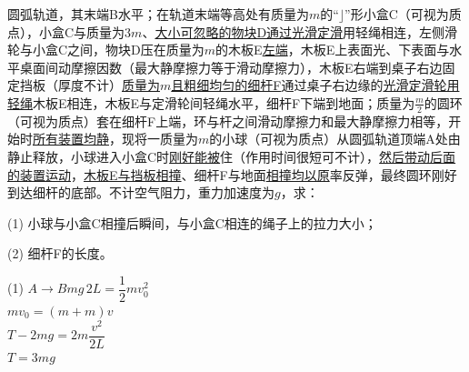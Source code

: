 \begin{problem}
圆弧轨道，其末端B水平；在轨道末端等高处有质量为$m$的“$\rfloor$”形小盒C（可视为质点），小盒C与质量为$3m$、\underline{大小可忽略的物块D通过光滑定滑}用轻绳相连，左侧滑轮与小盒C之间，物块D压在质量为\underline{$m$}的木板E\underline{左端}，木板E上表面光、下表面与水平桌面间动摩擦因数（最大静摩擦力等于滑动摩擦力），木板E右端到桌子右边固定挡板（厚度不计）\underline{质量为$m$且粗细均匀的细杆F}通过桌子右边缘的\underline{光滑定滑轮用轻绳}木板E相连，木板E与定滑轮间轻绳水平，细杆F下端到地面；质量为$\frac m2$的圆环（可视为质点）套在细杆F上端，环与杆之间滑动摩擦力和最大静摩擦力相等，开始时\underline{所有装置均静}，现将一质量为$m$的小球（可视为质点）从圆弧轨道顶端A处由静止释放，小球进入小盒C时\underline{刚好能被}住（作用时间很短可不计），\underline{然后带动后面的装置运动}，\underline{木板E与挡板相撞}、细杆F与地面\underline{相撞均以原}率反弹，最终圆环刚好到达细杆的底部。不计空气阻力，重力加速度为$g$，求：

(1) 小球与小盒C相撞后瞬间，与小盒C相连的绳子上的拉力大小；

(2) 细杆F的长度。


\begin{solution}
(1) $A\to B$\quad $mg\,2L=\dfrac12 mv_0^2$\\
\hspace*{3em}$mv_0=(m+m)v$\\
\hspace*{3em}$T-2mg=2m\dfrac{v^2}{2L}$\\
\hspace*{3em}$T=3mg$


\end{solution}
\end{problem}
